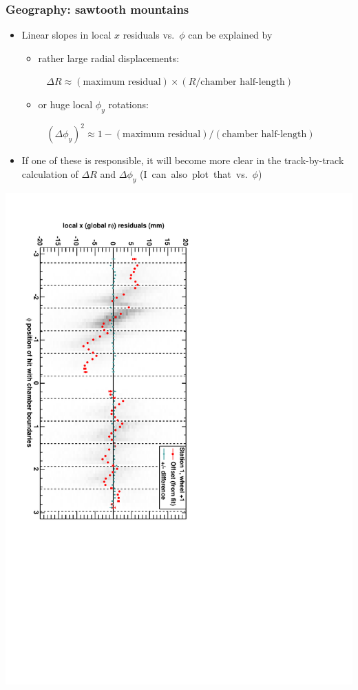 \documentclass[compress]{beamer}
\begin{document}

\begin{frame}
\frametitle{Geography: sawtooth mountains}
\begin{itemize}
\item Linear slopes in local $x$ residuals vs.\ $\phi$ can be explained by
\begin{itemize}
\item rather large radial displacements: 

\mbox{ } \hfill $\Delta R \approx (\mbox{maximum residual}) \times (R/\mbox{chamber half-length})$ \hfill \mbox{ }

\item or huge local $\phi_y$ rotations: 

\mbox{ } \hfill $(\Delta \phi_y)^2 \approx 1 - (\mbox{maximum residual}) / (\mbox{chamber half-length})$ \hfill \mbox{ }

\end{itemize}
\item If one of these is responsible, it will become more clear in the track-by-track calculation of $\Delta R$ and $\Delta \phi_y$ \mbox{(I can also plot that vs.\ $\phi$)\hspace{-1 cm}}
\end{itemize}

\vspace{-0.4 cm}
\begin{center}
\includegraphics[height=0.9\linewidth, angle=90]{DTrphiVsPhi_st1_whD.pdf}
\end{center}
\end{frame}
\end{document}
